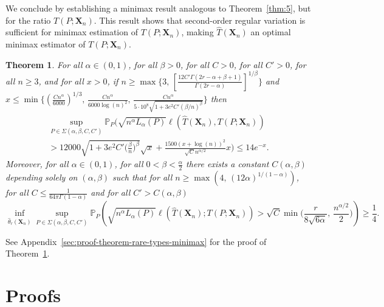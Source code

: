 \documentclass{article}
\newtheorem{theorem}{Theorem}
\newcommand{\1}{\boldsymbol{1}}
\newcommand{\PP}{\mathbb{P}}
\theoremstyle{plain}
\begin{document}
We conclude by establishing a minimax result analogous to Theorem~\ref{thm:5}, but for the ratio $T(P;\mathbf{X}_n)$. This result shows that second-order regular variation is sufficient for minimax estimation of $T(P;\mathbf{X}_n)$, making $\hat{T}(\mathbf{X}_{n})$ an optimal minimax estimator of $T(P;\mathbf{X}_n)$.

\begin{theorem}
  \label{thm:rare-types-minimax}
  For all $\alpha\in (0,1)$, for all $\beta > 0$, for all $C > 0$, for all $C' > 0$, for all $n\geq 3$, and for all $x > 0$, if $n \geq \max\{3,\, [\frac{12C'\Gamma(2r-\alpha+\beta+1)}{\Gamma(2r-\alpha)}]^{1/\beta}\}$ and $x \leq \min\{(\frac{Cn^{\alpha}}{6000})^{1/3},\,\frac{Cn^{\alpha}}{6000\log(n)^2},\, \frac{C n^{\alpha}}{5\cdot 10^8\sqrt{1 + 3e^2C'(\beta/n)^{\beta}}} \} $ then
  \begin{multline*}
    \sup_{P\in \Sigma(\alpha,\beta,C,C')}\PP_P\Bigg( \sqrt{n^{\alpha}L_{\alpha}(P) }\ell(\hat{T}(\mathbf{X}_{n}),T(P;\mathbf{X}_n))\\  > 12000\sqrt{1 + 3e^2C'\Big(\frac{\beta}{n} \Big)^{\beta}}\sqrt{x} + \frac{1500(x+\log(n))^2}{\sqrt{C}n^{\alpha/2}}x\Bigg)%
    \leq 14e^{-x}.
  \end{multline*}
  Moreover, for all $\alpha \in (0,1)$, for all $0 < \beta < \frac{\alpha}{2}$ there exists a constant $C(\alpha,\beta)$ depending solely on $(\alpha,\beta)$ such that for all $n \geq \max(4,\, (12\alpha)^{1/(1-\alpha)})$, for all $C \leq \frac{1}{64\pi\Gamma(1-\alpha)}$ and for all $C' > C(\alpha,\beta)$
  \begin{displaymath}
    \inf_{\hat{\theta}_r(\mathbf{X}_{n})}\sup_{P\in \Sigma(\alpha,\beta,C,C')}\PP_P\left(\sqrt{n^{\alpha}L_{\alpha}(P) }\ell(\hat{T}(\mathbf{X}_n);T(P;\mathbf{X}_n))  > \sqrt{C}\min\Big(\frac{r}{8\sqrt{6\alpha}},\,\frac{n^{\alpha/2}}{2}\Big) \right)%
    \geq \frac{1}{4}.
  \end{displaymath}%
\end{theorem}
See Appendix~\ref{sec:proof-theorem-rare-types-minimax} for the proof of Theorem~\ref{thm:rare-types-minimax}.


\appendix

\section{Proofs}
\label{sec:proofs-1}
\end{document}
